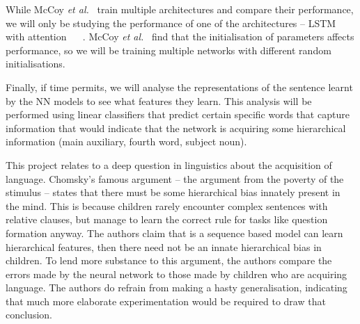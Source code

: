 \documentclass[11pt]{article}
\newcommand{\etal}{\textit{et al.}}
\begin{document}
While McCoy \etal ~\cite{McCoy} train multiple architectures and compare their performance, we will only be studying the performance of one of the architectures -- LSTM with attention ~\cite{BahdanauCB14} ~\cite{Hochreiter}. McCoy \etal ~\cite{McCoy} find that the initialisation of parameters affects performance, so we will be training multiple networks with different random initialisations.

Finally, if time permits, we will analyse the representations of the sentence learnt by the NN models to see what features they learn. This analysis will be performed using linear classifiers that predict certain specific words that capture information that would indicate that the network is acquiring some hierarchical information (main auxiliary, fourth word, subject noun).

This project relates to a deep question in linguistics about the acquisition of language. Chomsky's famous argument -- the argument from the poverty of the stimulus -- states that there must be some hierarchical bias innately present in the mind. This is because children rarely encounter complex sentences with relative clauses, but manage to learn the correct rule for tasks like question formation anyway. The authors claim that is a sequence based model can learn hierarchical features, then there need not be an innate hierarchical bias in children. To lend more substance to this argument, the authors compare the errors made by the neural network to those made by children who are acquiring language. The authors do refrain from making a hasty generalisation, indicating that much more elaborate experimentation would be required to draw that conclusion.
{}

\end{document}
